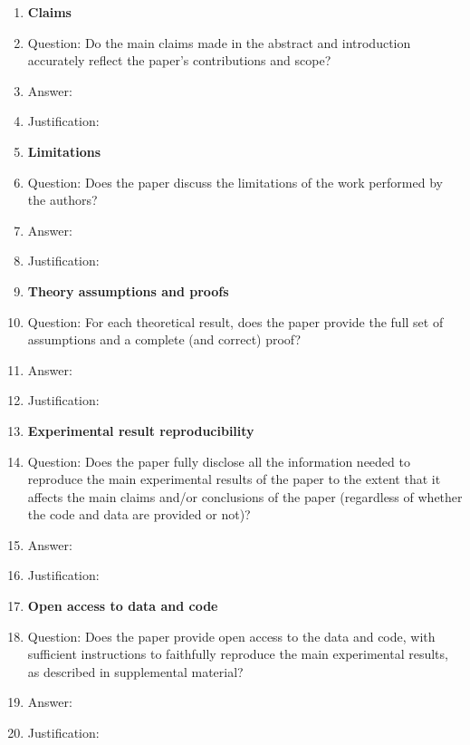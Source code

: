 \documentclass{article}
\begin{document}
\begin{enumerate}

\item {\bf Claims}
    \item[] Question: Do the main claims made in the abstract and introduction accurately reflect the paper's contributions and scope?
    \item[] Answer: \answerTODO{} %
    \item[] Justification: \justificationTODO{}

\item {\bf Limitations}
    \item[] Question: Does the paper discuss the limitations of the work performed by the authors?
    \item[] Answer: \answerTODO{} %
    \item[] Justification: \justificationTODO{}

\item {\bf Theory assumptions and proofs}
    \item[] Question: For each theoretical result, does the paper provide the full set of assumptions and a complete (and correct) proof?
    \item[] Answer: \answerTODO{} %
    \item[] Justification: \justificationTODO{}

\item {\bf Experimental result reproducibility}
    \item[] Question: Does the paper fully disclose all the information needed to reproduce the main experimental results of the paper to the extent that it affects the main claims and/or conclusions of the paper (regardless of whether the code and data are provided or not)?
    \item[] Answer: \answerTODO{} %
    \item[] Justification: \justificationTODO{}

\item {\bf Open access to data and code}
    \item[] Question: Does the paper provide open access to the data and code, with sufficient instructions to faithfully reproduce the main experimental results, as described in supplemental material?
    \item[] Answer: \answerTODO{} %
    \item[] Justification: \justificationTODO{}


\end{enumerate}
\end{document}
